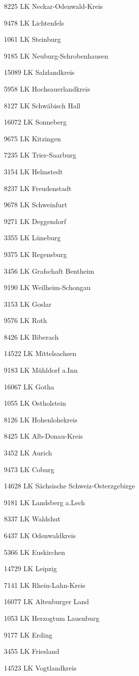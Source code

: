 8225  LK Neckar-Odenwald-Kreis

9478  LK Lichtenfels

1061  LK Steinburg

9185  LK Neuburg-Schrobenhausen

15089  LK Salzlandkreis

5958  LK Hochsauerlandkreis

8127  LK Schwäbisch Hall

16072  LK Sonneberg

9675  LK Kitzingen

7235  LK Trier-Saarburg

3154  LK Helmstedt

8237  LK Freudenstadt

9678  LK Schweinfurt

9271  LK Deggendorf

3355  LK Lüneburg

9375  LK Regensburg

3456  LK Grafschaft Bentheim

9190  LK Weilheim-Schongau

3153  LK Goslar

9576  LK Roth

8426  LK Biberach

14522  LK Mittelsachsen

9183  LK Mühldorf a.Inn

16067  LK Gotha

1055  LK Ostholstein

8126  LK Hohenlohekreis

8425  LK Alb-Donau-Kreis

3452  LK Aurich

9473  LK Coburg

14628  LK Sächsische Schweiz-Osterzgebirge

9181  LK Landsberg a.Lech

8337  LK Waldshut

6437  LK Odenwaldkreis

5366  LK Euskirchen

14729  LK Leipzig

7141  LK Rhein-Lahn-Kreis

16077  LK Altenburger Land

1053  LK Herzogtum Lauenburg

9177  LK Erding

3455  LK Friesland

14523  LK Vogtlandkreis

